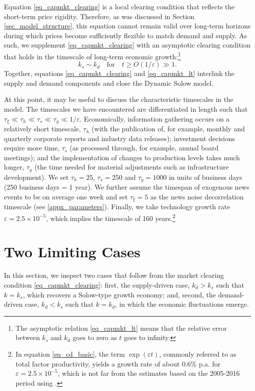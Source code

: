 \documentclass[authoryear, review]{elsarticle}
\begin{document}
Equation \eqref{eq_capmkt_clearing} is a local clearing condition that reflects the short-term price rigidity. Therefore, as was discussed in Section \ref{sec_model_structure}, this equation cannot remain valid over long-term horizons during which prices become sufficiently flexible to match demand and supply. As such, we supplement \eqref{eq_capmkt_clearing} with an asymptotic clearing condition that holds in the timescale of long-term economic growth:\footnote{The asymptotic relation \eqref{eq_capmkt_lt} means that the relative error between $k_s$ and $k_d$ goes to zero as $t$ goes to infinity.}
\begin{equation}\label{eq_capmkt_lt}
	k_s \sim k_d \quad \text{for} \quad t\geq O\left(1/\varepsilon\right) \gg 1.
\end{equation}
Together, equations \eqref{eq_capmkt_clearing} and \eqref{eq_capmkt_lt} interlink the supply and demand components and close the Dynamic Solow model. 

At this point, it may be useful to discuss the characteristic timescales in the model. The timescales we have encountered are differentiated in length such that $\tau_\xi\ll\tau_h\ll\tau_s\ll\tau_y\ll1/\varepsilon$. 
Economically, information gathering occurs on a relatively short timescale, $\tau_h$ (with the publication of, for example, monthly and quarterly corporate reports and industry data releases); investment decisions require more time, $\tau_s$ (as processed through, for example, annual board meetings); and the implementation of changes to production levels takes much longer, $\tau_y$ (the time needed for material adjustments such as infrastructure development). We set $\tau_h=25$, $\tau_s=250$ and $\tau_y=1000$ in units of business days (250 business days = 1 year). We further assume the timespan of exogenous news events to be on average one week and set $\tau_\xi=5$ as the news noise decorrelation timescale (see \ref{appx_parameters}). Finally, we take technology growth rate $\varepsilon=2.5\times10^{-5}$, which implies the timescale of 160 years.\footnote{
	In equation \eqref{eq_cd_basic}, the term $\exp(\varepsilon t)$, commonly referred to as total factor productivity, yields a growth rate of about 0.6\% p.a. for $\varepsilon=2.5\times10^{-5}$, which is not far from the estimates based on the 2005-2016 period using \cite{Fernald2016}.
}

\section{Two Limiting Cases}\label{sec_limitcases}
In this section, we inspect two cases that follow from the market clearing condition \eqref{eq_capmkt_clearing}: first, the supply-driven case, $k_d>k_s$ such that $k=k_s$, which recovers a Solow-type growth economy; and, second, the demand-driven case, $k_d<k_s$ such that $k=k_d$, in which the economic fluctuations emerge.
\end{document}
